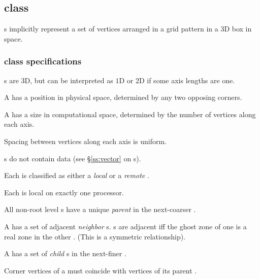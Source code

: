 \documentclass[11pt]{article}
\begin{document}
\subsection{ class} \label{ss:grid}

s implicitly represent a set of vertices arranged in
a grid pattern in a $3$D box in space.

\subsubsection{ class specifications} \label{sss:grid-specifications}

\BeginENUMERATE
\item {}s are $3$D, but can be interpreted as $1$D or $2$D if some axis lengths are one.
\item A  has a position in physical space, determined by any two opposing corners.
\item A  has a size in computational space, determined by the number of vertices along each axis.
\item Spacing between vertices along each axis is uniform.
\item {}s do not contain data (see \S\ref{ss:vector} on s).
\item Each  is  classified as either a \textit{local}  or a \textit{remote} .
\item Each  is local on exactly one processor.
\item All non-root level s have a unique \textit{parent}  in
    the next-coarser .
\item A  has a set of adjacent \textit{neighbor} s.
  s are adjacent iff the ghost zone of one  is a real
    zone in the other . (This is a symmetric relationship).
\item A  has a set of \textit{child} s in
the next-finer .
\item Corner vertices of a  must coincide with
vertices of its parent .
\EndENUMERATE

\end{document}
